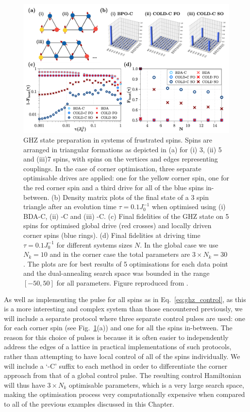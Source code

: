\begin{figure}[t]
    \centering
    \includegraphics[width=0.9\linewidth]{images/frustrated.png} \caption[Preparation of GHZ states in a system of frustrated spins.]{GHZ state preparation in systems of frustrated spins. Spins are arranged in triangular formations as depicted in (a) for (i) 3, (ii) 5 and (iii)7 spins, with spins on the vertices and edges representing couplings.  In the case of corner optimisation, three separate optimisable drives are applied: one for the yellow corner spin, one for the red corner spin and a third drive for all of the blue spins in-between. (b) Density matrix plots of the final state of a 3 spin triangle after an evolution time $\tau = 0.1J_0^{-1}$ when optimised using (i) BDA-C, (ii)  -C and (iii)  -C. (c) Final fidelities of the GHZ state on 5 spins for optimised global drive (red crosses) and locally driven corner spins (blue rings). (d) Final fidelities at driving time $\tau = 0.1J_0^{-1}$ for different systems sizes $N$. In the global case we use $N_k = 10$ and in the corner case the total parameters are $3 \times N_k = 30$. The plots are for best results of 5 optimisations for each data point and the dual-annealing search space was bounded in the range $[-50, 50]$ for all parameters. Figure reproduced from \cite{cepaite_cold_2023}.} \label{fig:ghz_mainfig}
\end{figure}

As well as implementing the  pulse for all spins as in Eq.~\ref{eq:ghz_control}, as this is a more interesting and complex system than those encountered previously, we will include a separate protocol where three separate control pulses are used: one for each corner spin (see Fig.~\ref{fig:ghz_mainfig}(a)) and one for all the spins in-between. The reason for this choice of pulses is because it is often easier to independently address the edges of a lattice in practical implementations of such protocols, rather than attempting to have local control of all of the spins individually. We will include a `-C' suffix to each method in order to differentiate the corner approach from that of a global control pulse. The resulting control Hamiltonian will thus have $3 \times N_k$ optimisable parameters, which is a very large search space, making the optimisation process very computationally expensive when compared to all of the previous examples discussed in this Chapter. 

